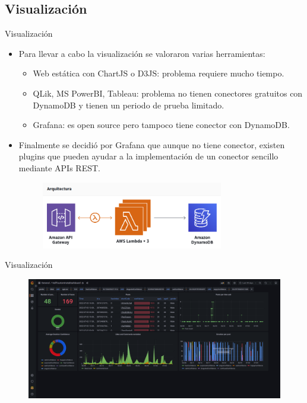 \documentclass[aspectratio=149]{beamer}
\begin{document}
\subsection{Visualización}
\begin{frame}[label=visualizacion1]{Visualización}
    \begin{itemize}
        \item Para llevar a cabo la visualización se valoraron varias herramientas:
        \begin{itemize}
            \item Web estática con ChartJS o D3JS: problema requiere mucho tiempo.
            \item QLik, MS PowerBI, Tableau: problema no tienen conectores gratuitos con DynamoDB y tienen un periodo de prueba limitado.
            \item Grafana: es open source pero tampoco tiene conector con DynamoDB.
        \end{itemize}
        \item Finalmente se decidió por Grafana que aunque no tiene conector, existen plugins que pueden ayudar a la implementación de un conector sencillo mediante APIs REST.
        \begin{figure}
            \centering
            \includegraphics[width=0.75\textwidth]{img/gateway_flow.png}
            \label{fig:gate_flow}
        \end{figure}
    \end{itemize}
\end{frame}
\begin{frame}[label=visualizacion2]{Visualización}
    \begin{figure}
        \centering
        \includegraphics[width=1.0\textwidth]{img/dashboard.png}
        \label{fig:grafana}
    \end{figure}
\end{frame}
\end{document}
